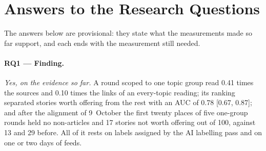 
\section{Answers to the Research Questions}
\label{sec:answers}

The answers below are provisional: they state what the measurements
made so far support, and each ends with the measurement still needed.

\paragraph{RQ1 --- Finding.} \emph{Yes, on the evidence so far.} A round
scoped to one topic group read 0.41 times the sources and 0.10 times the
links of an every-topic reading; its ranking separated stories worth
offering from the rest with an AUC of 0.78 [0.67, 0.87]; and after the
alignment of 9~October the first twenty places of five one-group rounds
held no non-articles and 17 stories not worth offering out of 100,
against 13 and 29 before. All of it rests on labels assigned by the AI
labelling pass and on one or two days of feeds.

